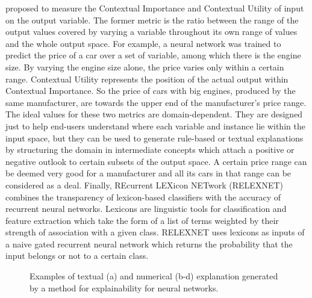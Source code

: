 \documentclass[final,1p,times]{elsarticle}
\begin{document}
\cite{framling1996explaining} proposed to measure the Contextual Importance and Contextual Utility of input on the output variable. The former metric is the ratio between the range of the output values covered by varying a variable throughout its own range of values and the whole output space. For example, a neural network was trained to predict the price of a car over a set of variable, among which there is the engine size. By varying the engine size alone, the price varies only within a certain range. Contextual Utility represents the position of the actual output within Contextual Importance. So the price of cars with big engines, produced by the same manufacturer, are towards the upper end of the manufacturer's price range. The ideal values for these two metrics are domain-dependent. They are designed just to help end-users understand where each variable and instance lie within the input space, but they can be used to generate rule-based or textual explanations by structuring the domain in intermediate concepts which attach a positive or negative outlook to certain subsets of the output space. A certain price range can be deemed very good for a manufacturer and all its cars in that range can be considered as a deal.
Finally, REcurrent LEXicon NETwork (RELEXNET) \cite{clos2017towards} combines the transparency of lexicon-based classifiers with the accuracy of recurrent neural networks. Lexicons are linguistic tools for classification and feature extraction which take the form of a list of terms weighted by their strength of association with a given class. RELEXNET uses lexicons as inputs of a naive gated recurrent neural network which returns the probability that the input belongs or not to a certain class.

\begin{figure}[!ht]
\begin{minipage}{\textwidth}
\centering
  \begin{subfigure}[b]{.52\linewidth}
  \centering
  \newline
  \end{subfigure}
  \begin{subfigure}[b]{.47\linewidth}
  \centering
  \newline
  \end{subfigure}
  \caption{Examples of textual (a) and numerical (b-d) explanation generated by a method for explainability for neural networks.}
  \label{fig:neural_networks_textual_numeric}
\end{minipage}
\end{figure}
\end{document}
